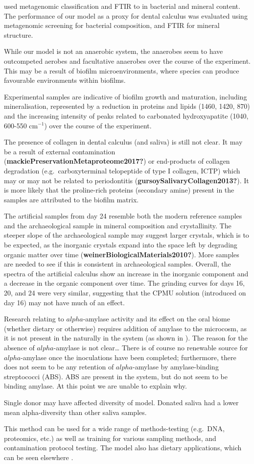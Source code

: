 \documentclass[
]{article}
\begin{document}
used metagenomic classification and FTIR to in bacterial and mineral
content. The performance of our model as a proxy for dental calculus was
evaluated using metagenomic screening for bacterial composition, and
FTIR for mineral structure.

While our model is not an anaerobic system, the anaerobes seem to have
outcompeted aerobes and facultative anaerobes over the course of the
experiment. This may be a result of biofilm microenvironments, where
species can produce favourable environments within biofilms.

Experimental samples are indicative of biofilm growth and maturation,
including mineralisation, represented by a reduction in proteins and
lipids (1460, 1420, 870) and the increasing intensity of peaks related
to carbonated hydroxyapatite (1040, 600-550 cm\(^{-1}\)) over the course
of the experiment.

The presence of collagen in dental calculus (and saliva) is still not
clear. It may be a result of external contamination
(\textbf{mackiePreservationMetaproteome2017?}) or end-products of
collagen degradation (e.g.~carboxyterminal telopeptide of type I
collagen, ICTP) which may or may not be related to periodontitis
(\textbf{gursoySalivaryCollagen2013?}). It is more likely that the
proline-rich proteins (secondary amine) present in the samples are
attributed to the biofilm matrix.

The artificial samples from day 24 resemble both the modern reference
samples and the archaeological sample in mineral composition and
crystallinity. The steeper slope of the archaeological sample may
suggest larger crystals, which is to be expected, as the inorganic
crystals expand into the space left by degrading organic matter over
time (\textbf{weinerBiologicalMaterials2010?}). More samples are needed
to see if this is consistent in archaeological samples. Overall, the
spectra of the artificial calculus show an increase in the inorganic
component and a decrease in the organic component over time. The
grinding curves for days 16, 20, and 24 were very similar, suggesting
that the CPMU solution (introduced on day 16) may not have much of an
effect.

Research relating to \(alpha\)-amylase activity and its effect on the
oral biome (whether dietary or otherwise) requires addition of amylase
to the microcosm, as it is not present in the naturally in the system
(as shown in ). The reason for the absence of \(alpha\)-amylase is not
clear\ldots{} There is of course no renewable source for
\(alpha\)-amylase once the inoculations have been completed;
furthermore, there does not seem to be any retention of
\(alpha\)-amylase by amylase-binding streptococci (ABS). ABS are present
in the system, but do not seem to be binding amylase. At this point we
are unable to explain why.

Single donor may have affected diversity of model. Donated saliva had a
lower mean alpha-diversity than other saliva samples.

This method can be used for a wide range of methods-testing (e.g.~DNA,
proteomics, etc.) as well as training for various sampling methods, and
contamination protocol testing. The model also has dietary applications,
which can be seen elsewhere .
\end{document}
